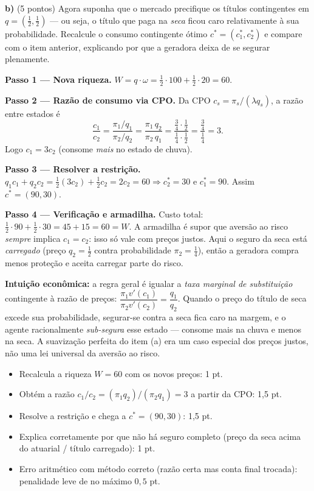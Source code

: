 \textbf{b)} (5 pontos) Agora suponha que o mercado precifique os títulos contingentes em $q=(\tfrac12,\tfrac12)$ --- ou seja, o título que paga na \emph{seca} ficou caro relativamente à sua probabilidade. Recalcule o consumo contingente ótimo $c^{*}=(c_1^{*},c_2^{*})$ e compare com o item anterior, explicando por que a geradora deixa de se segurar plenamente.
\resolucaobox{7.6cm}
\begin{solucao}
\textbf{Passo 1 --- Nova riqueza.} $W=q\cdot\omega=\tfrac12\cdot 100+\tfrac12\cdot 20=60$.

\textbf{Passo 2 --- Razão de consumo via CPO.} Da CPO $c_s=\pi_s/(\lambda q_s)$, a razão entre estados é
\[
\frac{c_1}{c_2}=\frac{\pi_1/q_1}{\pi_2/q_2}=\frac{\pi_1\,q_2}{\pi_2\,q_1}=\frac{\tfrac34\cdot\tfrac12}{\tfrac14\cdot\tfrac12}=\frac{\tfrac34}{\tfrac14}=3.
\]
Logo $c_1=3c_2$ (consome \emph{mais} no estado de chuva).

\textbf{Passo 3 --- Resolver a restrição.} $q_1 c_1+q_2 c_2=\tfrac12(3c_2)+\tfrac12 c_2=2c_2=60\Rightarrow c_2^{*}=30$ e $c_1^{*}=90$. Assim $c^{*}=(90,30)$.

\textbf{Passo 4 --- Verificação e armadilha.} Custo total: $\tfrac12\cdot 90+\tfrac12\cdot 30=45+15=60=W$. A armadilha é supor que aversão ao risco \emph{sempre} implica $c_1=c_2$: isso só vale com preços justos. Aqui o seguro da seca está \emph{carregado} (preço $q_2=\tfrac12$ contra probabilidade $\pi_2=\tfrac14$), então a geradora compra menos proteção e aceita carregar parte do risco.

\textbf{Intuição econômica:} a regra geral é igualar a \emph{taxa marginal de substituição} contingente à razão de preços: $\dfrac{\pi_1 v'(c_1)}{\pi_2 v'(c_2)}=\dfrac{q_1}{q_2}$. Quando o preço do título de seca excede sua probabilidade, segurar-se contra a seca fica caro na margem, e o agente racionalmente \emph{sub-segura} esse estado --- consome mais na chuva e menos na seca. A suavização perfeita do item (a) era um caso especial dos preços justos, não uma lei universal da aversão ao risco.
\rubricalabel
\begin{itemize}
\item Recalcula a riqueza $W=60$ com os novos preços: 1 pt.
\item Obtém a razão $c_1/c_2=(\pi_1 q_2)/(\pi_2 q_1)=3$ a partir da CPO: 1{,}5 pt.
\item Resolve a restrição e chega a $c^{*}=(90,30)$: 1{,}5 pt.
\item Explica corretamente por que não há seguro completo (preço da seca acima do atuarial / título carregado): 1 pt.
\item Erro aritmético com método correto (razão certa mas conta final trocada): penalidade leve de no máximo $0{,}5$ pt.
\end{itemize}
\end{solucao}


